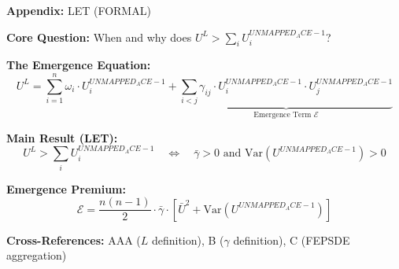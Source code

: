 
\begin{tcolorbox}[colback=blue!5!white, colframe=blue!75!black,
    title=Quick Reference: Level Emergence Theorem]
\textbf{Appendix:} LET (FORMAL)


\textbf{Core Question:} When and why does $U^L > \sum_i U^{UNMAPPED_ACE-1}_i$?

\textbf{The Emergence Equation:}
\begin{equation}
U^L = \sum_{i=1}^{n} \omega_i \cdot U^{UNMAPPED_ACE-1}_i + \underbrace{\sum_{i<j} \gamma_{ij} \cdot U^{UNMAPPED_ACE-1}_i \cdot U^{UNMAPPED_ACE-1}_j}_{\text{Emergence Term } \mathcal{E}}
\label{eq:let-aggregation}
\end{equation}

\textbf{Main Result (LET):}
\begin{equation}
\boxed{U^L > \sum_i U^{UNMAPPED_ACE-1}_i \quad \Longleftrightarrow \quad \bar{\gamma} > 0 \text{ and } \text{Var}(U^{UNMAPPED_ACE-1}) > 0}
\end{equation}

\textbf{Emergence Premium:}
\begin{equation}
\mathcal{E} = \frac{n(n-1)}{2} \cdot \bar{\gamma} \cdot \left[ \bar{U}^2 + \text{Var}(U^{UNMAPPED_ACE-1}) \right]
\end{equation}

\textbf{Cross-References:} AAA ($L$ definition), B ($\gamma$ definition), C (FEPSDE aggregation)
\end{tcolorbox}


